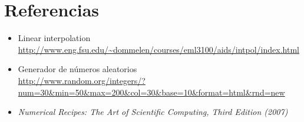 \section{Referencias}

\label{referencias}

\begin{itemize}
\item Linear interpolation\\ \url{http://www.eng.fsu.edu/~dommelen/courses/eml3100/aids/intpol/index.html}

\item Generador de números aleatorios\\ \url{http://www.random.org/integers/?num=30&min=50&max=200&col=30&base=10&format=html&rnd=new}

\item \textit{Numerical Recipes: The Art of Scientific Computing, Third Edition (2007)}
\end{itemize}
